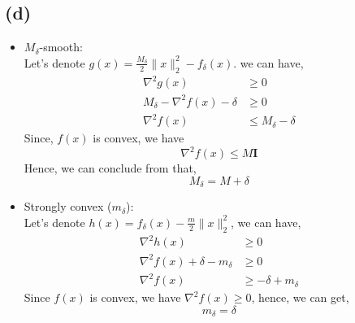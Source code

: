 \documentclass[12pt, a4 paper]{article}
\begin{document}
\begin{framed}
        \subsection{(d)}
        \begin{itemize}
            \item $M_{\delta}$-smooth:\\
            Let's denote $g(x) = \frac{M_{\delta}}{2} \lVert x \rVert_{2}^{2} - f_{\delta}(x)$.
            we can have,
            \begin{align}
                \nabla^{2} g(x) &\geq 0\\
                M_{\delta} - \nabla^{2} f(x) - \delta &\geq 0\\
                \nabla^{2} f(x) &\leq M_{\delta} - \delta
            \end{align}
            \indent Since, $f(x)$ is convex, we have 
            $$
            \nabla^{2} f(x) \leq M \boldsymbol{I}
            $$
            Hence, we can conclude from that,
            $$
            M_{\delta} = M + \delta
            $$

            \item Strongly convex ($m_{\delta}$):\\
            Let's denote $h(x) = f_{\delta}(x) - \frac{m}{2}\lVert x \rVert_{2}^{2}$, we can have,
            \begin{align}
                \nabla^{2} h(x) &\geq 0 \\
                \nabla^{2} f(x) + \delta - m_{\delta} &\geq 0\\
                \nabla^{2} f(x) &\geq -\delta + m_{\delta}
            \end{align}
            \indent Since $f(x)$ is convex, we have $\nabla^{2}f(x)
            \geq 0$, hence, we can get,
            $$
            m_{\delta} = \delta
            $$
        \end{itemize}
    \end{framed}
    
\end{document}
